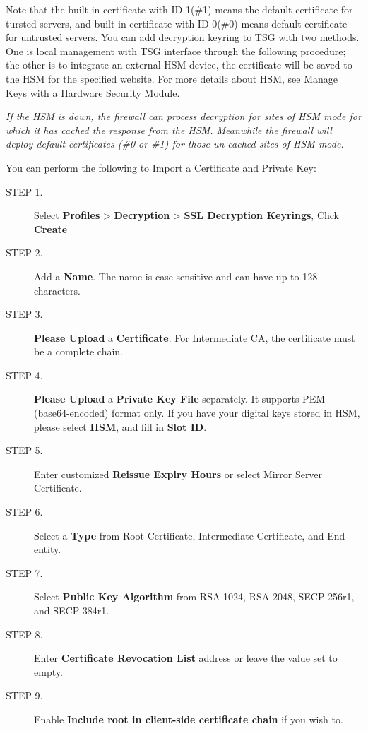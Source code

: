 Note that the built-in certificate with ID 1(\#1) means the default certificate for tursted servers, 
and built-in certificate with ID 0(\#0) means default certificate for untrusted servers. 
You can add decryption keyring to TSG with two methods. One is local management with TSG interface through the following procedure; 
the other is to integrate an external HSM device, the certificate will be saved to the HSM for the specified website. 
For more details about HSM, see Manage Keys with a Hardware Security Module.


\notemark\textit{If the HSM is down, the firewall can process decryption for sites of HSM mode for which it has cached the response from the HSM. 
Meanwhile the firewall will deploy default certificates (\#0 or \#1) for those un-cached sites of HSM mode.}


You can perform the following to Import a Certificate and Private Key:

\begin{description}
    \item[STEP 1.]	Select \textbf{Profiles} > \textbf{Decryption} > \textbf{SSL Decryption Keyrings}, Click \textbf{Create}
    \item[STEP 2.]	Add a \textbf{Name}. The name is case-sensitive and can have up to 128 characters.
    \item[STEP 3.]	\textbf{Please Upload} a \textbf{Certificate}. For Intermediate CA, the certificate must be a complete chain.
    \item[STEP 4.]	\textbf{Please Upload} a \textbf{Private Key File} separately. It supports PEM (base64-encoded) format only. 
        If you have your digital keys stored in HSM, please select \textbf{HSM}, and fill in \textbf{Slot ID}.
    \item[STEP 5.]	Enter customized \textbf{Reissue Expiry Hours} or select Mirror Server Certificate.
    \item[STEP 6.]	Select a \textbf{Type} from Root Certificate, Intermediate Certificate, and End-entity.
    \item[STEP 7.]	Select \textbf{Public Key Algorithm} from RSA 1024, RSA 2048, SECP 256r1, and SECP 384r1.
    \item[STEP 8.]	Enter \textbf{Certificate Revocation List} address or leave the value set to empty.
    \item[STEP 9.]	Enable \textbf{Include root in client-side certificate chain} if you wish to.
\end{description}

